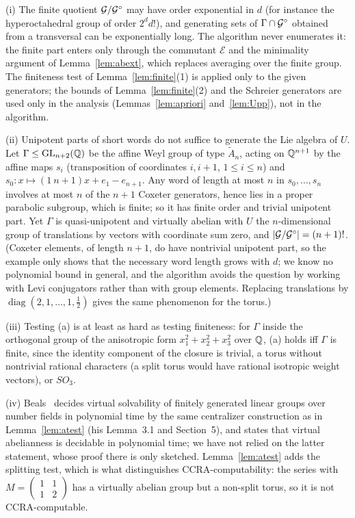 \begin{remark}\label{rem:polytime}
(i) The finite quotient $\mathcal{G}/\mathcal{G}^\circ$ may have order exponential in $d$ (for instance the hyperoctahedral
group of order $2^dd!$), and generating sets of $\Gamma\cap\mathcal{G}^\circ$ obtained from a transversal can be
exponentially long. The algorithm never enumerates it: the finite part enters only through the commutant
$\mathcal E$ and the minimality argument of Lemma~\ref{lem:abext}, which replaces averaging over the finite group.
The finiteness test of Lemma~\ref{lem:finite}(1) is applied only to the given generators; the bounds of
Lemma~\ref{lem:finite}(2) and the Schreier generators are used only in the analysis
(Lemmas~\ref{lem:apriori} and~\ref{lem:Upp}), not in the algorithm.

(ii) Unipotent parts of short words do not suffice to generate the Lie algebra of $U$. Let
$\Gamma\le\mathrm{GL}_{n+2}(\mathbb{Q})$ be the affine Weyl group of type $\tilde A_n$, acting on $\mathbb{Q}^{n+1}$ by the
affine maps $s_i$ (transposition of coordinates $i,i+1$, $1\le i\le n$) and
$s_0:x\mapsto(1\ n{+}1)x+e_1-e_{n+1}$. Any word of length at most $n$ in $s_0,\ldots,s_n$ involves at
most $n$ of the $n+1$ Coxeter generators, hence lies in a proper parabolic subgroup, which is finite; so it
has finite order and trivial unipotent part. Yet $\Gamma$ is quasi-unipotent and virtually abelian with
$U$ the $n$-dimensional group of translations by vectors with coordinate sum zero, and
$|\mathcal{G}/\mathcal{G}^\circ|=(n+1)!$. (Coxeter elements, of length $n+1$, do have nontrivial unipotent part, so the
example only shows that the necessary word length grows with $d$; we know no polynomial bound in
general, and the algorithm avoids the question by working with Levi conjugators rather than with group
elements. Replacing translations by $\operatorname{diag}(2,1,\ldots,1,\tfrac12)$ gives the same phenomenon
for the torus.)

(iii) Testing (a) is at least as hard as testing finiteness: for $\Gamma$ inside the orthogonal group
of the anisotropic form $x_1^2+x_2^2+x_3^2$ over $\mathbb{Q}$, (a) holds iff $\Gamma$ is finite, since the identity
component of the closure is trivial, a torus without nontrivial rational characters (a split torus would
have rational isotropic weight vectors), or $SO_3$.

(iv) Beals~\cite{Bea99} decides virtual solvability of finitely generated linear groups over number fields in
polynomial time by the same centralizer construction as in Lemma~\ref{lem:atest} (his Lemma~3.1 and
Section~5), and states that virtual abelianness is decidable in polynomial time; we have not relied on the
latter statement, whose proof there is only sketched. Lemma~\ref{lem:atest} adds the splitting test, which
is what distinguishes CCRA-computability: the series with $M=\left(\begin{smallmatrix}1&1\\1&2\end{smallmatrix}\right)$
has a virtually abelian group but a non-split torus, so it is not CCRA-computable.
\end{remark}

